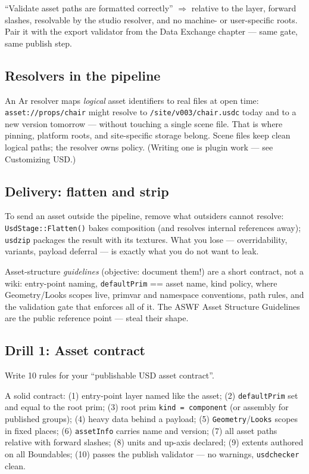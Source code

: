 \begin{ExamTip}
``Validate asset paths are formatted correctly'' $\Rightarrow$ relative to the
layer, forward slashes, resolvable by the studio resolver, and no machine-
or user-specific roots. Pair it with the export validator from the Data
Exchange chapter --- same gate, same publish step.
\end{ExamTip}

\subsection{Resolvers in the pipeline}\label{sec:pd-res}
An Ar resolver maps \emph{logical} asset identifiers to real
files at open time: \texttt{asset://props/chair} might resolve to
\texttt{/site/v003/chair.usdc} today and to a new version tomorrow ---
without touching a single scene file. That is where pinning, platform roots,
and site-specific storage belong. Scene files keep clean logical paths; the
resolver owns policy. (Writing one is plugin work --- see Customizing USD.)

\subsection{Delivery: flatten and strip}\label{sec:pd-deliver}
To send an asset outside the pipeline, remove what outsiders cannot resolve:
\texttt{UsdStage::Flatten()} bakes composition (and resolves internal
references away); \texttt{usdzip} packages the result with its textures.
What you lose --- overridability, variants, payload deferral --- is exactly
what you do not want to leak.

\begin{DeepDive}
Asset-structure \emph{guidelines} (objective: document them!) are a short
contract, not a wiki: entry-point naming, \texttt{defaultPrim} == asset name,
kind policy, where Geometry/Looks scopes live, primvar and namespace
conventions, path rules, and the validation gate that enforces all of it.
The ASWF Asset Structure Guidelines are the public reference point --- steal
their shape.
\end{DeepDive}

\DrillsTitle
\subsection*{Drill 1: Asset contract}
Write 10 rules for your ``publishable USD asset contract''.
\begin{DrillSolution}
A solid contract: (1) entry-point layer named like the asset; (2)
\texttt{defaultPrim} set and equal to the root prim; (3) root prim
\texttt{kind = component} (or assembly for published groups); (4) heavy data
behind a payload; (5) \texttt{Geometry}/\texttt{Looks} scopes in fixed
places; (6) \texttt{assetInfo} carries name and version; (7) all asset paths
relative with forward slashes; (8) units and up-axis declared; (9) extents
authored on all Boundables; (10) passes the publish validator --- no
warnings, \texttt{usdchecker} clean.
\end{DrillSolution}

